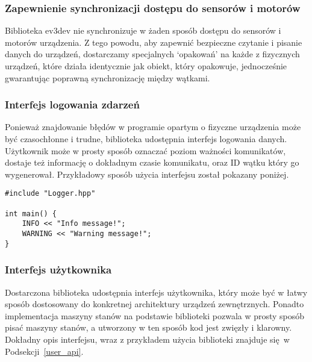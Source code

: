 \documentclass{article}
\begin{document}
\subsubsection*{Zapewnienie synchronizacji dostępu do sensorów i motorów}
Biblioteka ev3dev nie synchronizuje w żaden sposób dostępu do sensorów i motorów
urządzenia. Z tego powodu, aby zapewnić bezpieczne czytanie i pisanie danych do
urządzeń, dostarczamy specjalnych `opakowań' na każde z fizycznych urządzeń,
które działa identycznie jak obiekt, który opakowuje, jednocześnie gwarantując
poprawną synchronizację między wątkami.
\subsubsection*{Interfejs logowania zdarzeń}
Ponieważ znajdowanie błędów w programie opartym o fizyczne urządzenia może być
czasochłonne i trudne, biblioteka udostępnia interfejs logowania danych.
Użytkownik może w prosty sposób oznaczać poziom ważności komunikatów, dostaje
też informację o dokładnym czasie komunikatu, oraz ID wątku który go
wygenerował. Przykładowy sposób użycia interfejsu został pokazany poniżej.
\begin{lstlisting}
#include "Logger.hpp"

int main() {
    INFO << "Info message!";
    WARNING << "Warning message!";
}
\end{lstlisting}
\subsubsection*{Interfejs użytkownika}
Dostarczona biblioteka udostępnia interfejs użytkownika, który może być
w łatwy sposób dostosowany do konkretnej architektury urządzeń zewnętrznych.
Ponadto implementacja maszyny stanów na podstawie biblioteki pozwala w prosty
sposób pisać maszyny stanów, a utworzony w ten sposób kod jest zwięzły i
klarowny. Dokładny opis interfejsu, wraz z przykładem użycia biblioteki znajduje
się w Podsekcji~\ref{user_api}.
\end{document}
